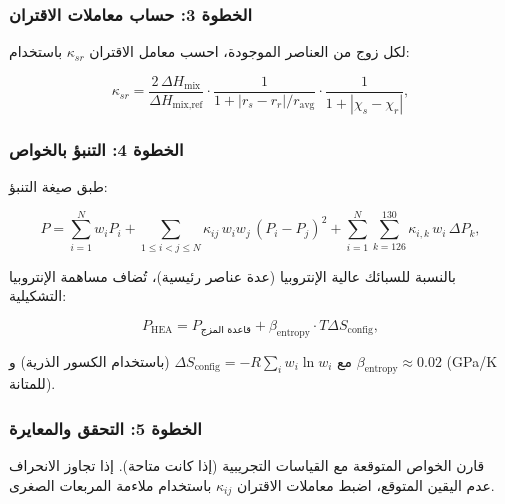 \documentclass[11pt,a4paper]{article}
\begin{document}
\begin{otherlanguage}{arabic}
		\subsubsection{الخطوة 3: حساب معاملات الاقتران}
		
		لكل زوج من العناصر الموجودة، احسب معامل الاقتران \(\kappa_{sr}\) باستخدام:
		
		\[
		\kappa_{sr} = \frac{2\,\Delta H_{\text{mix}}}{\Delta H_{\text{mix,ref}}} \cdot
		\frac{1}{1 + |r_s - r_r|/r_{\text{avg}}} \cdot
		\frac{1}{1 + |\chi_s - \chi_r|},
		\]
		
		\subsubsection{الخطوة 4: التنبؤ بالخواص}
		
		طبق صيغة التنبؤ:
		
		\[
		P = \sum_{i=1}^{N} w_i P_i
		+ \sum_{1\le i<j\le N} \kappa_{ij}\, w_i w_j\, (P_i - P_j)^2
		+ \sum_{i=1}^{N} \sum_{k=126}^{130} \kappa_{i,k}\, w_i\, \Delta P_k,
		\]
		
		بالنسبة للسبائك عالية الإنتروبيا (عدة عناصر رئيسية)، تُضاف مساهمة الإنتروبيا التشكيلية:
		
		\[
		P_{\text{HEA}} = P_{\text{قاعدة المزج}} + \beta_{\text{entropy}} \cdot T \Delta S_{\text{config}},
		\]
		
		مع \(\Delta S_{\text{config}} = -R \sum_i w_i \ln w_i\) (باستخدام الكسور الذرية) و \(\beta_{\text{entropy}} \approx 0.02\) (GPa/K للمتانة).
		
		\subsubsection{الخطوة 5: التحقق والمعايرة}
		
		قارن الخواص المتوقعة مع القياسات التجريبية (إذا كانت متاحة). إذا تجاوز الانحراف عدم اليقين المتوقع، اضبط معاملات الاقتران \(\kappa_{ij}\) باستخدام ملاءمة المربعات الصغرى.
		
	\end{otherlanguage}
	
\end{document}
